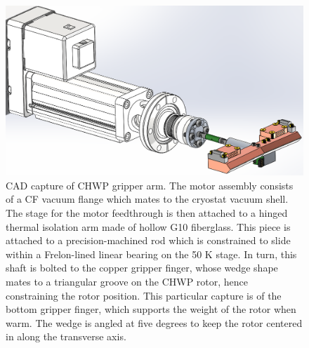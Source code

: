 \begin{figure}[ht!]
    \centering
    \includegraphics[width=0.98\linewidth]{CHWPDesign/Figures/Gripper_arm.png}
    \caption[CAD capture of CHWP gripper arm]{CAD capture of CHWP gripper arm. The motor assembly consists of a CF vacuum flange which mates to the cryostat vacuum shell. The stage for the motor feedthrough is then attached to a hinged thermal isolation arm made of hollow G10 fiberglass. This piece is attached to a precision-machined rod which is constrained to slide within a Frelon-lined linear bearing on the 50 K stage. In turn, this shaft is bolted to the copper gripper finger, whose wedge shape mates to a triangular groove on the CHWP rotor, hence constraining the rotor position. This particular capture is of the bottom gripper finger, which supports the weight of the rotor when warm. The wedge is angled at five degrees to keep the rotor centered in along the transverse axis.}
    \label{fig:chwp_gripper}
\end{figure}

